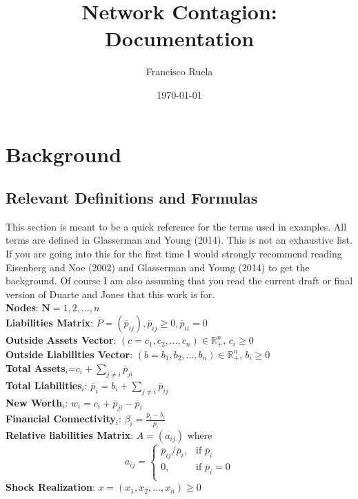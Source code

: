 \documentclass{article}
\newcommand{\R}{\mathbb{R}}
\newcommand{\N}{\mathbf{N}}
\newcommand{\?}{\stackrel{?}{=}}
\newcommand{\pbar}{\overline{p}}
\newcommand{\Pbar}{\overline{P}}
\begin{document}
\title{Network Contagion: Documentation}
\date{\today}
\author{Francisco Ruela}
\maketitle

\tableofcontents
\newpage
\section{Background}
\subsection{Relevant Definitions and Formulas}
This section is meant to be a quick reference for the terms used in examples. All terms are defined in Glasserman and Young (2014). This is not an exhaustive list. If you are going into this for the first time I would strongly recommend reading Eisenberg and Noe (2002) and Glasserman and Young (2014) to get the background. Of course I am also assuming that you read the current draft or final version of Duarte and Jones that this work is for.
\vspace{.5cm}
\\{\bf Nodes}: $\N={1,2,\dots,n}$ 
\\{\bf Liabilities Matrix}: $\Pbar=(\pbar_{ij}), \pbar_{ij}\geq 0, \pbar_{ii}=0$
\\{\bf Outside Assets Vector}: $(c= c_1,c_2,\dots,c_n)\in\R^n_+,\,c_i\geq0$
\\{\bf Outside Liabilities Vector}: $(b= b_1,b_2,\dots,b_n)\in\R^n_+,\,b_i\geq0$
\\{\bf Total Assets$_i$}=$c_i+\sum_{j\neq i} \pbar_{ji}$
\\{\bf Total Liabilities$_i$}: $\pbar_i=b_i+\sum_{j\neq i}\pbar_{ij}$
\\{\bf New Worth$_i$}: $w_i=c_i+\pbar_{ji}-\pbar_i$
\\{\bf Financial Connectivity$_i$}: $\beta_i=\frac{\pbar_i-b_i}{\pbar_i}$
\\{\bf Relative liabilities Matrix}: $A=(a_{ij})$ where 
		\[ a_{ij} = \begin{cases}
	                                   \pbar_{ij}/\pbar_i, & \text{if $\pbar_i$} \\
	                                   0, & \text{if $\pbar_i=0$} \\
		\end{cases} \]
{\bf Shock Realization}: $x=(x_1,x_2,\dots,x_n)\geq0$
\end{document}
